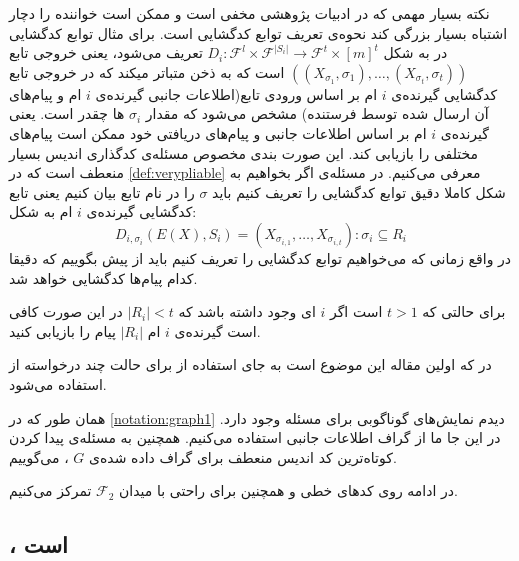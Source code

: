 \begin{remark}
	نکته بسیار مهمی که در ادبیات پژوهشی 
	\picod
	مخفی است و ممکن است خواننده را دچار اشتباه بسیار بزرگی کند نحوه‌ی تعریف توابع کدگشایی است. برای مثال توابع کدگشایی در
	\cite{song2017polynomialtime}
	به شکل
	$D_i: \mathcal{F}^l \times \mathcal{F}^{|S_i|} \rightarrow \mathcal{F}^t \times [m]^t$
	تعریف می‌شود، یعنی خروجی تابع
	$((X_{\sigma_1}, \sigma_1), \ldots, (X_{\sigma_t}, \sigma_t) )$
	است که به ذخن متباتر میکند که در خروجی تابع کدگشایی گیرنده‌ی 
	$i$
	ام بر اساس ورودی تابع(اطلاعات جانبی گیرنده‌ی 
	$i$
	ام و پیام‌های آن ارسال شده توسط فرستنده) مشخص می‌شود که مقدار
	$\sigma_i$
	ها چقدر است. یعنی گیرنده‌ی
	$i$
	ام بر اساس اطلاعات جانبی و پیام‌های دریافتی خود ممکن است پیام‌های مختلفی را بازیابی کند. این صورت بندی مخصوص مسئله‌ی کدگذاری اندیس بسیار منعطف است که در
	\autoref{def:verypliable}
	معرفی می‌کنیم. در مسئله‌ی
	\picod
	اگر بخواهیم به شکل کاملا دقیق توابع کدگشایی را تعریف کنیم باید 
	$\sigma$
	 را در نام تابع بیان کنیم یعنی تابع کدگشایی گیرنده‌ی
	 $i$
	 ام به شکل:
	 	$$D_{i, \sigma_i}(E(X), S_i) = (X_{\sigma_{i,1}}, \ldots, X_{\sigma_{i,t}}): \sigma_i \subseteq R_i $$
	 	در واقع زمانی که می‌خواهیم توابع کدگشایی را تعریف کنیم باید از پیش بگوییم که دقیقا کدام پیام‌ها کدگشایی خواهد شد.
\end{remark}

\begin{note}
	برای حالتی که
	$t > 1$
	است اگر
	$i$
	ای وجود داشته باشد که
	$|R_i| < t$
	در این صورت کافی است گیرنده‌ی 
	$i$
	ام
	$|R_i|$
	پیام را بازیابی کنید.
	\cite{pliablefirstpaper}
\end{note}

\begin{note}
	در 
	\cite{pliablefirstpaper}
	که اولین مقاله این موضوع است به جای استفاده از
	\picodt
	برای حالت چند درخواسته از
	استفاده می‌شود.
\end{note}
\begin{notation}
	همان طور که در
	\autoref{notation:graph1}
	دیدم نمایش‌های گوناگوبی برای مسئله وجود دارد. در این جا ما از گراف اطلاعات جانبی استفاده می‌کنیم. همچنین به مسئله‌ی پیدا کردن کوتاه‌ترین کد اندیس منعطف برای گراف داده شده‌ی 
	$G$
	،
	\picodg
	می‌گوییم.
\end{notation}


در ادامه روی کدهای خطی و همچنین برای راحتی با میدان
$\mathcal{F}_2$
تمرکز می‌کنیم.

\subsection{
\lpicod
،
\nphard
 است
}

